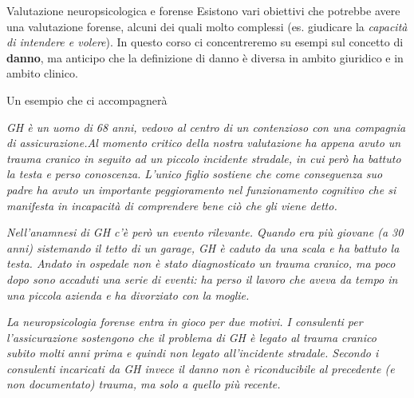 \documentclass[
  ignorenonframetext,
]{beamer}
\begin{document}
\begin{frame}{Valutazione neuropsicologica e forense}
\label{valutazione-neuropsicologica-e-forense}
Esistono vari obiettivi che potrebbe avere una valutazione forense,
alcuni dei quali molto complessi (es. giudicare la \emph{capacità di
intendere e volere}). In questo corso ci concentreremo su esempi sul
concetto di \textbf{danno}, ma anticipo che la definizione di danno è
diversa in ambito giuridico e in ambito clinico.
\end{frame}

\begin{frame}{Un esempio che ci accompagnerà}
\label{un-esempio-che-ci-accompagneruxe0}
\scriptsize

\emph{GH è un uomo di 68 anni, vedovo al centro di un contenzioso con
una compagnia di assicurazione.Al momento critico della nostra
valutazione ha appena avuto un trauma cranico in seguito ad un piccolo
incidente stradale, in cui però ha battuto la testa e perso conoscenza.
L'unico figlio sostiene che come conseguenza suo padre ha avuto un
importante peggioramento nel funzionamento cognitivo che si manifesta in
incapacità di comprendere bene ciò che gli viene detto.}

\emph{Nell'anamnesi di GH c'è però un evento rilevante. Quando era più
giovane (a 30 anni) sistemando il tetto di un garage, GH è caduto da una
scala e ha battuto la testa. Andato in ospedale non è stato
diagnosticato un trauma cranico, ma poco dopo sono accaduti una serie di
eventi: ha perso il lavoro che aveva da tempo in una piccola azienda e
ha divorziato con la moglie.}

\emph{La neuropsicologia forense entra in gioco per due motivi. I
consulenti per l'assicurazione sostengono che il problema di GH è legato
al trauma cranico subito molti anni prima e quindi non legato
all'incidente stradale. Secondo i consulenti incaricati da GH invece il
danno non è riconducibile al precedente (e non documentato) trauma, ma
solo a quello più recente.}
\end{frame}
\end{document}
